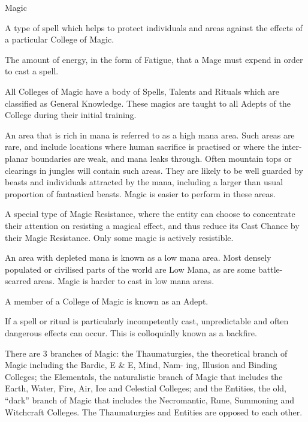 \begin{Chapter}{Magic}
\begin{Description}
\item[Counterspell] A type of spell which helps to protect individuals
  and areas against the effects of a particular College of Magic.

\item[Fatigue Cost] The amount of energy, in the form of Fatigue, that
  a Mage must expend in order to cast a spell.

\item[General Knowledge] All Colleges of Magic have a body of Spells,
  Talents and Rituals which are classified as General Knowledge.
  These magics are taught to all Adepts of the College during their
  initial training.

\item[High Mana] An area that is rich in mana is referred to as a high
  mana area.  Such areas are rare, and include locations where human
  sacrifice is practised or where the inter-planar boundaries are
  weak, and mana leaks through.  Often mountain tops or clearings in
  jungles will contain such areas.  They are likely to be well guarded
  by beasts and individuals attracted by the mana, including a larger
  than usual proportion of fantastical beasts.  Magic is easier to
  perform in these areas.

\item[Active Resistance] A special type of Magic Resistance, where the
  entity can choose to concentrate their attention on resisting a
  magical effect, and thus reduce its Cast Chance by their Magic
  Resistance. Only some magic is actively resistible.

\item[Low Mana] An area with depleted mana is known as a low mana
  area.  Most densely populated or civilised parts of the world are
  Low Mana, as are some battle-scarred areas.  Magic is harder to cast
  in low mana areas.

\item[Adept] A member of a College of Magic is known as an Adept.

\item[Backfire] If a spell or ritual is particularly incompetently
  cast, unpredictable and often dangerous effects can occur.  This is
  colloquially known as a backfire.

\item[Branches of Magic] There are 3 branches of Magic: the
  Thaumaturgies, the theoretical branch of Magic including the Bardic,
  E \& E, Mind, Nam- ing, Illusion and Binding Colleges; the
  Elementals, the naturalistic branch of Magic that includes the
  Earth, Water, Fire, Air, Ice and Celestial Colleges; and the
  Entities, the old, “dark” branch of Magic that includes the
  Necromantic, Rune, Summoning and Witchcraft Colleges.  The
  Thaumaturgies and Entities are opposed to each other.


\end{Description}
\end{Chapter}

